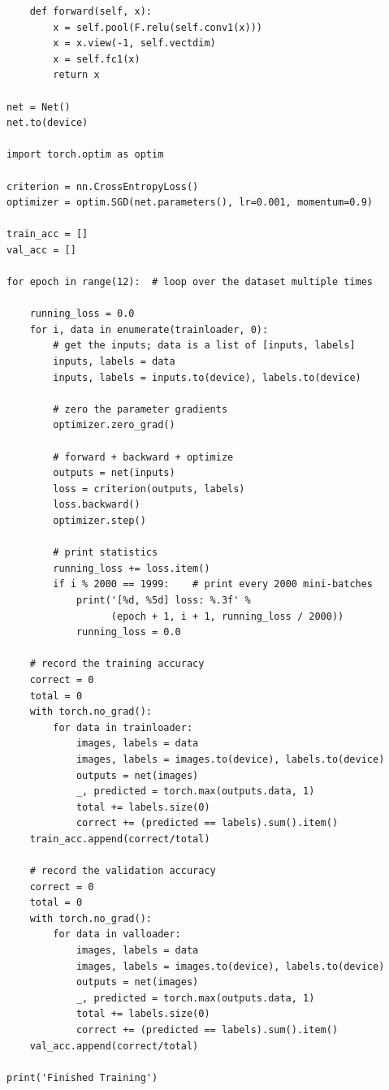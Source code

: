 \documentclass{article}
\begin{document}
\begin{enumerate}
\begin{verbatim}
    def forward(self, x):
        x = self.pool(F.relu(self.conv1(x)))
        x = x.view(-1, self.vectdim)
        x = self.fc1(x)
        return x

net = Net()
net.to(device)

import torch.optim as optim

criterion = nn.CrossEntropyLoss()
optimizer = optim.SGD(net.parameters(), lr=0.001, momentum=0.9)

train_acc = []
val_acc = []

for epoch in range(12):  # loop over the dataset multiple times

    running_loss = 0.0
    for i, data in enumerate(trainloader, 0):
        # get the inputs; data is a list of [inputs, labels]
        inputs, labels = data
        inputs, labels = inputs.to(device), labels.to(device)

        # zero the parameter gradients
        optimizer.zero_grad()

        # forward + backward + optimize
        outputs = net(inputs)
        loss = criterion(outputs, labels)
        loss.backward()
        optimizer.step()

        # print statistics
        running_loss += loss.item()
        if i % 2000 == 1999:    # print every 2000 mini-batches
            print('[%d, %5d] loss: %.3f' %
                  (epoch + 1, i + 1, running_loss / 2000))
            running_loss = 0.0

    # record the training accuracy
    correct = 0
    total = 0
    with torch.no_grad():
        for data in trainloader:
            images, labels = data
            images, labels = images.to(device), labels.to(device)
            outputs = net(images)
            _, predicted = torch.max(outputs.data, 1)
            total += labels.size(0)
            correct += (predicted == labels).sum().item()
    train_acc.append(correct/total)

    # record the validation accuracy
    correct = 0
    total = 0
    with torch.no_grad():
        for data in valloader:
            images, labels = data
            images, labels = images.to(device), labels.to(device)
            outputs = net(images)
            _, predicted = torch.max(outputs.data, 1)
            total += labels.size(0)
            correct += (predicted == labels).sum().item()
    val_acc.append(correct/total)

print('Finished Training')
        \end{verbatim}
        

\end{enumerate}
\end{document}
